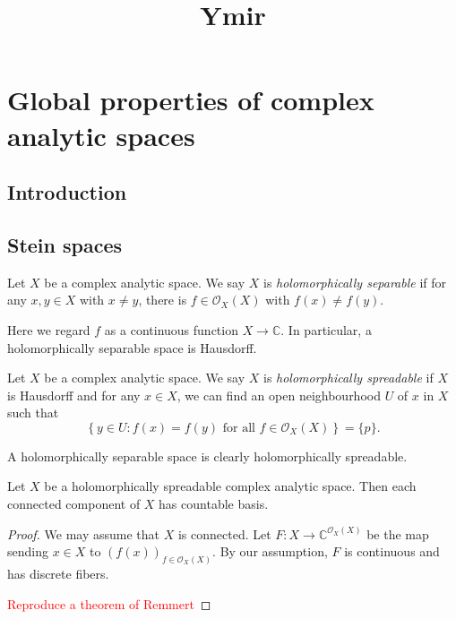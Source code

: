 
\title{Ymir}

\maketitle
\tableofcontents

\chapter*{Global properties of complex analytic spaces}\label{chap-CGlobalProperty}

\section{Introduction}\label{sec-introduction-CGlobalProperty}

\section{Stein spaces}
\begin{definition}
    Let $X$ be a complex analytic space. We say $X$ is \emph{holomorphically separable} if for any $x,y\in X$ with $x\neq y$, there is $f\in \mathcal{O}_X(X)$ with $f(x)\neq f(y)$.
\end{definition}
Here we regard $f$ as a continuous function $X\rightarrow \mathbb{C}$. In particular, a holomorphically separable space is Hausdorff.

\begin{definition}
    Let $X$ be a complex analytic space. We say $X$ is \emph{holomorphically spreadable} if $X$ is Hausdorff and for any $x\in X$, we can find an open neighbourhood $U$ of $x$ in $X$ such that
    \[
        \left\{y\in U:f(x)=f(y)\text{ for all }f\in \mathcal{O}_X(X) \right\} =\{p\}.
    \]
\end{definition}
A holomorphically separable space is clearly holomorphically spreadable.



\begin{proposition}
    Let $X$ be a holomorphically spreadable complex analytic space. Then each connected component of $X$ has countable basis.
\end{proposition}
\begin{proof}
    We may assume that $X$ is connected.
    Let $F:X\rightarrow \mathbb{C}^{\mathcal{O}_X(X)}$ be the map sending $x\in X$ to $(f(x))_{f\in \mathcal{O}_X(X)}$. By our assumption, $F$ is continuous and has discrete fibers. 
    
    \textcolor{red}{Reproduce a theorem of Remmert}
\end{proof}

